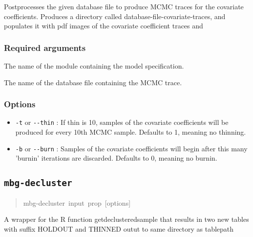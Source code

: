 Postprocesses the given database file to produce MCMC traces for the covariate
coefficients. Produces a directory called database-file-covariate-traces, and populates
it with pdf images of the covariate coefficient traces and




\subsubsection{Required arguments%
}
\setcounter{listcnt0}{0}
\begin{list}{.}
{
\setlength{\rightmargin}{\leftmargin}
}

\item The name of the module containing the model specification.

\item The name of the database file containing the MCMC trace.
\end{list}




\subsubsection{Options%
}
%
\begin{itemize}

\item \texttt{-t} or \texttt{-{}-thin} : If thin is 10, samples of the covariate coefficients will be
produced for every 10th MCMC sample. Defaults to 1, meaning no thinning.

\item \texttt{-b} or \texttt{-{}-burn} : Samples of the covariate coefficients will begin after this
many 'burnin' iterations are discarded. Defaults to 0, meaning no burnin.

\end{itemize}




\subsection{\texttt{mbg-decluster}%
}
%
\begin{quote}{\ttfamily \raggedright \noindent
mbg-decluster~input~prop~{[}options{]}
}
\end{quote}

A wrapper for the R function getdeclusteredsample that results in two new tables with
suffix HOLDOUT and THINNED outut to same directory as tablepath




